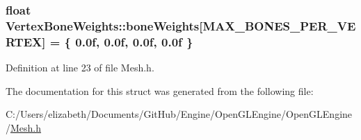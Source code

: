 \subsubsection[{\texorpdfstring{bone\+Weights}{boneWeights}}]{\setlength{\rightskip}{0pt plus 5cm}float Vertex\+Bone\+Weights\+::bone\+Weights\mbox{[}{\bf M\+A\+X\+\_\+\+B\+O\+N\+E\+S\+\_\+\+P\+E\+R\+\_\+\+V\+E\+R\+T\+EX}\mbox{]} = \{ 0.\+0f, 0.\+0f, 0.\+0f, 0.\+0f \}}\hypertarget{struct_vertex_bone_weights_a88efd7130f4b024cdb15a79a2dfcddd6}{}\label{struct_vertex_bone_weights_a88efd7130f4b024cdb15a79a2dfcddd6}


Definition at line 23 of file Mesh.\+h.



The documentation for this struct was generated from the following file\+:\begin{DoxyCompactItemize}
\item 
C\+:/\+Users/elizabeth/\+Documents/\+Git\+Hub/\+Engine/\+Open\+G\+L\+Engine/\+Open\+G\+L\+Engine/\hyperlink{_mesh_8h}{Mesh.\+h}\end{DoxyCompactItemize}
